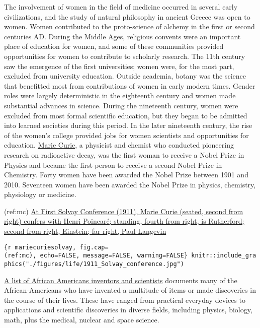 \documentclass[
]{article}
\begin{document}
The involvement of women in the field of medicine occurred in several
early civilizations, and the study of natural philosophy in ancient
Greece was open to women. Women contributed to the proto-science of
alchemy in the first or second centuries AD. During the Middle Ages,
religious convents were an important place of education for women, and
some of these communities provided opportunities for women to contribute
to scholarly research. The 11th century saw the emergence of the first
universities; women were, for the most part, excluded from university
education. Outside academia, botany was the science that benefitted most
from contributions of women in early modern times. Gender roles were
largely deterministic in the eighteenth century and women made
substantial advances in science. During the nineteenth century, women
were excluded from most formal scientific education, but they began to
be admitted into learned societies during this period. In the later
nineteenth century, the rise of the women's college provided jobs for
women scientists and opportunities for education.
\href{https://en.wikipedia.org/wiki/Marie_Curie}{Marie Curie}, a
physicist and chemist who conducted pioneering research on radioactive
decay, was the first woman to receive a Nobel Prize in Physics and
became the first person to receive a second Nobel Prize in Chemistry.
Forty women have been awarded the Nobel Prize between 1901 and 2010.
Seventeen women have been awarded the Nobel Prize in physics, chemistry,
physiology or medicine.

(ref:mc)
\href{https://commons.wikimedia.org/wiki/File:1911_Solvay_conference.jpg}{At
First Solvay Conference (1911), Marie Curie (seated, second from right)
confers with Henri Poincaré; standing, fourth from right, is Rutherford;
second from right, Einstein; far right, Paul Langevin}

\texttt{\{r\ mariecuriesolvay,\ fig.cap=\textquotesingle{}(ref:mc)\textquotesingle{},\ echo=FALSE,\ message=FALSE,\ warning=FALSE\}\ knitr::include\_graphics("./figures/life/1911\_Solvay\_conference.jpg")}

\href{https://en.wikipedia.org/wiki/List_of_African-American_inventors_and_scientists}{A
list of African Americans inventors and scientists} documents many of
the African-Americans who have invented a multitude of items or made
discoveries in the course of their lives. These have ranged from
practical everyday devices to applications and scientific discoveries in
diverse fields, including physics, biology, math, plus the medical,
nuclear and space science.
\end{document}
